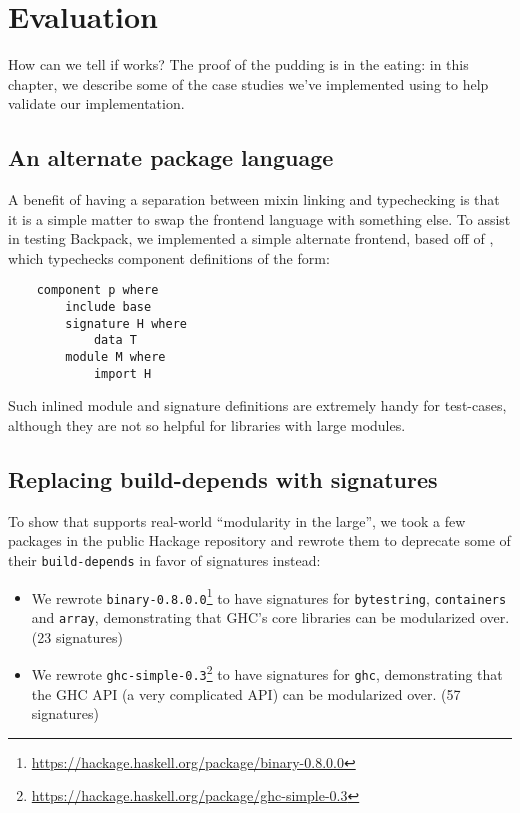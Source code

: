 
\chapter{Evaluation}
\label{sec:evaluation}

How can we tell if \Backpack{} works?  The proof of the pudding is
in the eating: in this chapter, we describe some of the case studies
we've implemented using \Backpack{} to help validate our implementation.

\section{An alternate package language}

A benefit of having a separation between mixin linking and typechecking
is that it is a simple matter to swap the frontend language with
something else.  To assist in testing Backpack, we implemented a simple
alternate frontend, based off of \OldBackpack{}, which typechecks
component definitions of the form:

\begin{verbatim}
    component p where
        include base
        signature H where
            data T
        module M where
            import H
\end{verbatim}
%
Such inlined module and signature definitions
are extremely handy for test-cases, although
they are not so helpful for libraries with large modules.

\section{Replacing build-depends with signatures}

To show that
\Backpack{} supports real-world ``modularity in the large'', we took a few
packages in the public Hackage repository and rewrote them to deprecate some of
their \verb|build-depends|
in favor of signatures instead:

\begin{itemize}
    \item We rewrote \texttt{binary-0.8.0.0}\footnote{\smaller\url{https://hackage.haskell.org/package/binary-0.8.0.0}}
          to have signatures
          for \texttt{byte\-string}, \texttt{containers} and \texttt{array},
          demonstrating that GHC's core libraries can be modularized
          over. (23 signatures)

    \item We rewrote \texttt{ghc-simple-0.3}\footnote{\smaller\url{https://hackage.haskell.org/package/ghc-simple-0.3}} to have signatures
          for \texttt{ghc}, demonstrating that the GHC API (a very
          complicated API) can be modularized over. (57 signatures)
\end{itemize}

